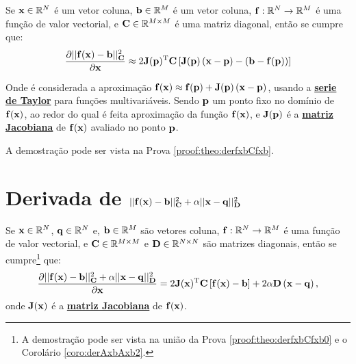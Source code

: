 \begin{theorem}\label{theo:derfxbCfxb}
Se 
$\VECTOR{x}\in \mathbb{R}^N$ é um vetor coluna, 
$\VECTOR{b}\in \mathbb{R}^M$ é um vetor coluna,  
$\VECTOR{f}: \mathbb{R}^{N}\rightarrow \mathbb{R}^{M}$ é uma função de valor vectorial, e
$\MATRIX{C} \in \mathbb{R}^{M\times M}$ é uma matriz diagonal, 
então se cumpre que:
\begin{equation}
\frac{\partial ||\VECTOR{f}(\VECTOR{x})-\VECTOR{b}||_{\MATRIX{C}}^2}{\partial \VECTOR{x}} \approx
2 \MATRIX{J}(\VECTOR{p})^{\transpose}\MATRIX{C}\left[\MATRIX{J}(\VECTOR{p})\left(\VECTOR{x} - \VECTOR{p}\right)-\left(\VECTOR{b}-\VECTOR{f}(\VECTOR{p})\right)\right]
\end{equation}

Onde é considerada a aproximação
$\VECTOR{f}(\VECTOR{x})\approx \VECTOR{f}(\VECTOR{p})+\MATRIX{J}(\VECTOR{p})\left(\VECTOR{x}-\VECTOR{p}\right)$,
usando a \hyperref[def:taylor]{\textbf{serie de Taylor}} para funções multivariáveis. Sendo $\VECTOR{p}$ um ponto fixo no domínio de $\VECTOR{f}(\VECTOR{x})$,  ao redor do qual é feita  aproximação
da função $\VECTOR{f}(\VECTOR{x})$,
e $\MATRIX{J}(\VECTOR{p})$ é a \hyperref[def:jacobian]{\textbf{matriz Jacobiana}} de $\VECTOR{f}(\VECTOR{x})$ avaliado no ponto $\VECTOR{p}$.

A demostração pode ser vista na Prova \ref{proof:theo:derfxbCfxb}.
\end{theorem}



\section{Derivada de $||\VECTOR{f}(\VECTOR{x})-\VECTOR{b}||_{\MATRIX{C}}^2+\alpha||\VECTOR{x}-\VECTOR{q}||_{\MATRIX{D}}^2$ 
}

\begin{theorem}\label{theo:exact:derfxbCfxbxqDxq}
Se 
$\VECTOR{x}\in \mathbb{R}^N$,
$\VECTOR{q}\in \mathbb{R}^N$ e, 
$\VECTOR{b}\in \mathbb{R}^M$ são vetores coluna,  
$\VECTOR{f}: \mathbb{R}^{N}\rightarrow \mathbb{R}^{M}$ é uma função de valor vectorial, e
$\MATRIX{C} \in \mathbb{R}^{M\times M}$ e $\MATRIX{D} \in \mathbb{R}^{N\times N}$ são matrizes diagonais, 
então se cumpre\footnote{A 
demostração pode ser vista na união da Prova \ref{proof:theo:derfxbCfxb0} e o Corolário \ref{coro:derAxbAxb2}.} que:
\begin{equation}
\frac{\partial ||\VECTOR{f}(\VECTOR{x})-\VECTOR{b}||_{\MATRIX{C}}^2+\alpha||\VECTOR{x}-\VECTOR{q}||_{\MATRIX{D}}^2}{\partial \VECTOR{x}} 
= 2 \MATRIX{J}(\VECTOR{x})^{\transpose}\MATRIX{C}\left[\VECTOR{f}(\VECTOR{x})-\VECTOR{b}\right]
+ 2 \alpha\MATRIX{D}\left(\VECTOR{x}-\VECTOR{q}\right),
\end{equation}
onde $\MATRIX{J}(\VECTOR{x})$ é a \hyperref[def:jacobian]{\textbf{matriz Jacobiana}} de $\VECTOR{f}(\VECTOR{x})$.
\end{theorem}



